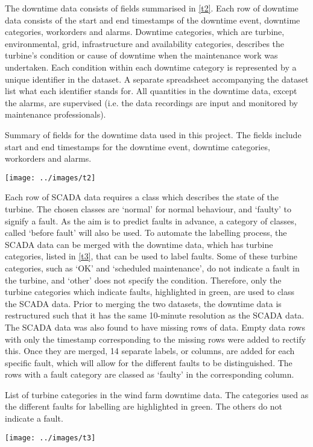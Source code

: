 The downtime data consists of fields summarised in \autoref{t2}. Each row of
downtime data consists of the start and end timestamps of the downtime event,
downtime categories, workorders and alarms. Downtime categories, which are
turbine, environmental, grid, infrastructure and availability categories,
describes the turbine's condition or cause of downtime when the maintenance
work was undertaken. Each condition within each downtime category is
represented by a unique identifier in the dataset. A separate spreadsheet
accompanying the dataset list what each identifier stands for. All quantities
in the downtime data, except the alarms, are supervised (i.e. the data
recordings are input and monitored by maintenance professionals).

\begin{table}
  \centering
  \caption{\label{t2}Summary of fields for the downtime data used in this
  project. The fields include start and end timestamps for the downtime event,
  downtime categories, workorders and alarms.}
  \texttt{[image: ../images/t2]}
\end{table}

Each row of SCADA data requires a class which describes the state of the
turbine. The chosen classes are `normal' for normal behaviour, and `faulty' to
signify a fault. As the aim is to predict faults in advance, a category of
classes, called `before fault' will also be used. To automate the labelling
process, the SCADA data can be merged with the downtime data, which has
turbine categories, listed in \autoref{t3}, that can be used to label faults.
Some of these turbine categories, such as `OK' and `scheduled maintenance', do
not indicate a fault in the turbine, and `other' does not specify the
condition. Therefore, only the turbine categories which indicate faults,
highlighted in green, are used to class the SCADA data. Prior to merging the
two datasets, the downtime data is restructured such that it has the same
10-minute resolution as the SCADA data. The SCADA data was also found to have
missing rows of data. Empty data rows with only the timestamp corresponding to
the missing rows were added to rectify this. Once they are merged, 14 separate
labels, or columns, are added for each specific fault, which will allow for
the different faults to be distinguished. The rows with a fault category are
classed as `faulty' in the corresponding column.

\begin{table}
  \centering
  \caption{\label{t3}List of turbine categories in the wind farm downtime
  data. The categories used as the different faults for labelling are
  highlighted in green. The others do not indicate a fault.}
  \texttt{[image: ../images/t3]}
\end{table}

